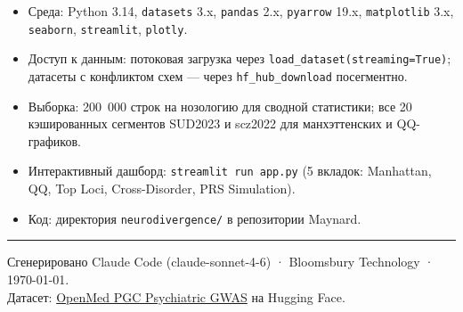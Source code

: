\documentclass[11pt, a4paper]{article}
\begin{document}
\begin{itemize}
  \item Среда: Python 3.14, \texttt{datasets} 3.x, \texttt{pandas} 2.x,
        \texttt{pyarrow} 19.x, \texttt{matplotlib} 3.x, \texttt{seaborn},
        \texttt{streamlit}, \texttt{plotly}.
  \item Доступ к данным: потоковая загрузка через \texttt{load\_dataset(streaming=True)};
        датасеты с конфликтом схем — через \texttt{hf\_hub\_download} посегментно.
  \item Выборка: 200~000 строк на нозологию для сводной статистики;
        все 20 кэшированных сегментов SUD2023 и scz2022 для манхэттенских
        и QQ-графиков.
  \item Интерактивный дашборд: \texttt{streamlit run app.py}
        (5 вкладок: Manhattan, QQ, Top Loci, Cross-Disorder, PRS Simulation).
  \item Код: директория \texttt{neurodivergence/} в репозитории Maynard.
\end{itemize}

\vspace{12pt}\hrule\vspace{6pt}
{\small\color{muted}
Сгенерировано Claude Code (claude-sonnet-4-6) · Bloomsbury Technology · \today.\\
Датасет: \href{https://huggingface.co/collections/OpenMed/pgc-psychiatric-gwas-summary-statistics}%
{OpenMed PGC Psychiatric GWAS} на Hugging Face.
}
\end{document}
